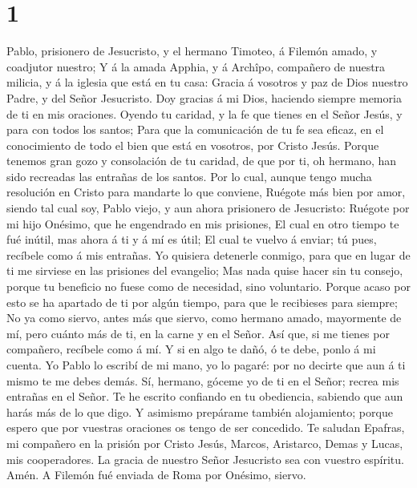 \hypertarget{section}{%
\section{1}\label{section}}

 Pablo, prisionero de Jesucristo, y el hermano Timoteo, á
Filemón amado, y coadjutor nuestro;  Y á la amada Apphia,
y á Archîpo, compañero de nuestra milicia, y á la iglesia que está en tu
casa:  Gracia á vosotros y paz de Dios nuestro Padre, y
del Señor Jesucristo.  Doy gracias á mi Dios, haciendo
siempre memoria de ti en mis oraciones.  Oyendo tu
caridad, y la fe que tienes en el Señor Jesús, y para con todos los
santos;  Para que la comunicación de tu fe sea eficaz, en
el conocimiento de todo el bien que está en vosotros, por Cristo Jesús.
 Porque tenemos gran gozo y consolación de tu caridad, de
que por ti, oh hermano, han sido recreadas las entrañas de los santos.
 Por lo cual, aunque tengo mucha resolución en Cristo para
mandarte lo que conviene,  Ruégote más bien por amor,
siendo tal cual soy, Pablo viejo, y aun ahora prisionero de Jesucristo:
 Ruégote por mi hijo Onésimo, que he engendrado en mis
prisiones,  El cual en otro tiempo te fué inútil, mas
ahora á ti y á mí es útil;  El cual te vuelvo á enviar;
tú pues, recíbele como á mis entrañas.  Yo quisiera
detenerle conmigo, para que en lugar de ti me sirviese en las prisiones
del evangelio;  Mas nada quise hacer sin tu consejo,
porque tu beneficio no fuese como de necesidad, sino voluntario.
 Porque acaso por esto se ha apartado de ti por algún
tiempo, para que le recibieses para siempre;  No ya como
siervo, antes más que siervo, como hermano amado, mayormente de mí, pero
cuánto más de ti, en la carne y en el Señor.  Así que, si
me tienes por compañero, recíbele como á mí.  Y si en
algo te dañó, ó te debe, ponlo á mi cuenta.  Yo Pablo lo
escribí de mi mano, yo lo pagaré: por no decirte que aun á ti mismo te
me debes demás.  Sí, hermano, góceme yo de ti en el
Señor; recrea mis entrañas en el Señor.  Te he escrito
confiando en tu obediencia, sabiendo que aun harás más de lo que digo.
 Y asimismo prepárame también alojamiento; porque espero
que por vuestras oraciones os tengo de ser concedido.  Te
saludan Epafras, mi compañero en la prisión por Cristo Jesús,
 Marcos, Aristarco, Demas y Lucas, mis cooperadores.
 La gracia de nuestro Señor Jesucristo sea con vuestro
espíritu. Amén. A Filemón fué enviada de Roma por Onésimo, siervo.
